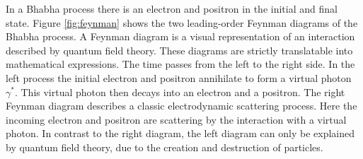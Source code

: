 \documentclass[a4paper,11pt,twosided,final,german,openbib,pdftex,listof=totoc,bibliography=totoc]{scrbook}
\begin{document}
In a Bhabha process there is an electron and positron in the initial and final state. Figure \ref{fig:feynman} shows the two leading-order Feynman diagrams of the Bhabha process. 
A Feynman diagram is a visual representation of an interaction described by quantum field theory. These diagrams are strictly translatable into mathematical expressions.
The time passes from the left to the right side. In the left process the initial electron and positron annihilate to form a virtual photon $\gamma^\ast$. This virtual photon then decays into an electron and a positron. The right Feynman diagram describes a classic electrodynamic scattering process. Here the incoming electron and positron are scattering by the interaction with a virtual photon. In contrast to the right diagram, the left diagram can only be explained by quantum field theory, due to the creation and destruction of particles.
 

\end{document}
